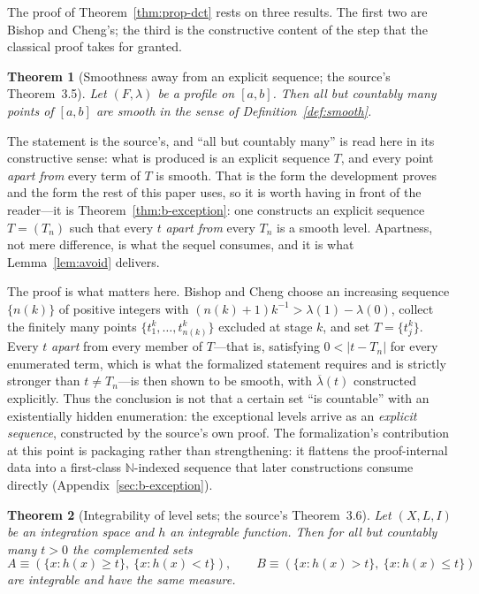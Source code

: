 \documentclass[11pt]{article}
\newtheorem{theorem}{Theorem}[section]
\theoremstyle{definition}
\theoremstyle{remark}
\begin{document}
The proof of Theorem~\ref{thm:prop-dct} rests on three results.  The first two are Bishop and Cheng's; the third is the constructive content of the step that the classical proof takes for granted.

\begin{theorem}[Smoothness away from an explicit sequence; the source's Theorem~3.5]
\label{thm:3-5}
Let $(F,\lambda)$ be a profile on $[a,b]$.  Then all but countably many points of $[a,b]$ are smooth in the sense of Definition~\ref{def:smooth}.
\end{theorem}

The statement is the source's, and ``all but countably many'' is read here in its
constructive sense: what is produced is an explicit sequence $T$, and every point
\emph{apart from} every term of $T$ is smooth.  That is the form the development proves and the form the rest
of this paper uses, so it is worth having in front of the reader---it is
Theorem~\ref{thm:b-exception}: one constructs an explicit sequence $T=(T_n)$ such
that every $t$ \emph{apart from} every $T_n$ is a smooth level.  Apartness, not
mere difference, is what the sequel consumes, and it is what
Lemma~\ref{lem:avoid} delivers.

The proof is what matters here.  Bishop and Cheng choose an increasing sequence $\{n(k)\}$ of positive integers with $(n(k)+1)k^{-1}>\lambda(1)-\lambda(0)$, collect the finitely many points $\{t^k_1,\dots,t^k_{n(k)}\}$ excluded at stage $k$, and set $T=\{t^k_j\}$.  Every $t$ \emph{apart} from every member of $T$---that is, satisfying $0<|t-T_n|$ for every enumerated term, which is what the formalized statement requires and is strictly stronger than $t\neq T_n$---is then shown to be smooth, with $\overline{\lambda}(t)$ constructed explicitly.  Thus the conclusion is not that a certain set ``is countable'' with an existentially hidden enumeration: the exceptional levels arrive as an \emph{explicit sequence}, constructed by the source's own proof.  The formalization's contribution at this point is packaging rather than strengthening: it flattens the proof-internal data into a first-class $\mathbb{N}$-indexed sequence that later constructions consume directly (Appendix~\ref{sec:b-exception}).

\begin{theorem}[Integrability of level sets; the source's Theorem~3.6]
\label{thm:3-6}
Let $(X,L,I)$ be an integration space and $h$ an integrable function.  Then for all but countably many $t>0$ the complemented sets
\[
A\equiv(\{x:h(x)\ge t\},\ \{x:h(x)<t\}),\qquad
B\equiv(\{x:h(x)>t\},\ \{x:h(x)\le t\})
\]
are integrable and have the same measure.
\end{theorem}
\end{document}
